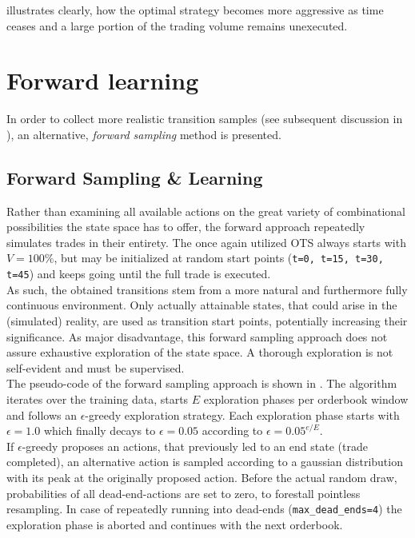  illustrates clearly, how the optimal strategy becomes more aggressive as time ceases and a large portion of the trading volume remains unexecuted.




\section{Forward learning}
\label{chap:forwardlearning}
In order to collect more realistic transition samples (see subsequent discussion in ), an alternative, \emph{forward sampling} method is presented.

\subsection{Forward Sampling \& Learning}
Rather than examining all available actions on the great variety of combinational possibilities the state space has to offer, the forward approach repeatedly simulates trades in their entirety. The once again utilized \ac{OTS} always starts with $V=100\%$, but may be initialized at random start points (\eg \lstinline!t=0, t=15, t=30, t=45!) and keeps going until the full trade is executed.\\

As such, the obtained transitions stem from a more natural and furthermore fully continuous environment. Only actually attainable states, that could arise in the (simulated) reality, are used as transition start points, potentially increasing their significance. As major disadvantage, this forward sampling approach does not assure exhaustive exploration of the state space. A thorough exploration is not self-evident and must be supervised.\\

The pseudo-code of the forward sampling approach is shown in . The algorithm iterates over the training data, starts $E$ exploration phases per orderbook window and follows an $\epsilon$-greedy exploration strategy. Each exploration phase starts with $\epsilon=1.0$ which finally decays to $\epsilon=0.05$ according to $\epsilon=0.05^{e/E}$.\\

If $\epsilon$-greedy proposes an actions, that previously led to an end state (\ie trade completed), an alternative action is sampled according to a gaussian distribution with its peak at the originally proposed action. Before the actual random draw, probabilities of all dead-end-actions are set to zero, to forestall pointless resampling. In case of repeatedly running into dead-ends (\eg \lstinline!max_dead_ends=4!) the exploration phase is aborted and continues with the next orderbook.\\

